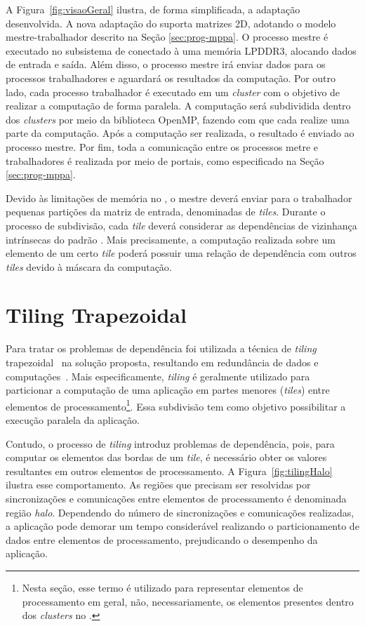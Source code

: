 A Figura~\ref{fig:visaoGeral} ilustra, de forma simplificada, a adaptação
desenvolvida. A nova adaptação do \fw suporta matrizes 2D, adotando o modelo
mestre-trabalhador descrito na Seção \ref{sec:prog-mppa}. O processo mestre é
executado no subsistema de \es conectado à uma memória LPDDR3, alocando dados de
entrada e saída. Além disso, o processo mestre irá enviar dados para os processos
trabalhadores e aguardará os resultados da computação. Por outro lado, cada processo
trabalhador é executado em um \textit{cluster} com o objetivo de realizar a
computação \stencil de forma paralela. A computação será subdividida dentro dos
\textit{clusters} por meio da biblioteca OpenMP, fazendo com que cada \pe realize uma parte
da computação. Após a computação ser realizada, o resultado é enviado ao
processo mestre. Por fim, toda a comunicação entre os processos metre e trabalhadores é
realizada por meio de portais, como especificado na Seção \ref{sec:prog-mppa}.

Devido às limitações de memória no \mppa, o mestre deverá enviar para o
trabalhador pequenas partições da matriz de entrada, denominadas de
\textit{tiles}. Durante o processo de subdivisão, cada \textit{tile} deverá
considerar as dependências de vizinhança intrínsecas do padrão \stencil. Mais
precisamente, a computação realizada sobre um elemento de um certo \textit{tile}
poderá possuir uma relação de dependência com outros \textit{tiles} devido à
máscara da computação.


\section{Tiling Trapezoidal}
\label{sec:tiling}
Para tratar os problemas de dependência foi utilizada a técnica de
\textit{tiling} trapezoidal~\cite{meng11} na solução proposta, resultando em redundância de
dados e computações~\cite{rocha17}. Mais especificamente, \textit{tiling} é
geralmente utilizado para particionar a computação de uma aplicação \stencil em
partes menores (\textit{tiles}) entre elementos de processamento\footnote{Nesta
seção, esse termo é utilizado para representar elementos de processamento em
geral, não, necessariamente, os elementos presentes dentro dos \textit{clusters}
no \mppa.}. Essa subdivisão tem como objetivo possibilitar a execução paralela da aplicação.

Contudo, o processo de \textit{tiling} introduz problemas de dependência, pois,
para computar os elementos das bordas de um \textit{tile}, é necessário obter
os valores resultantes em outros elementos de processamento. A Figura~\ref{fig:tilingHalo} ilustra
esse comportamento. As regiões que precisam ser resolvidas por sincronizações e
comunicações entre elementos de processamento é denominada região \textit{halo}. Dependendo do número
de sincronizações e comunicações realizadas, a aplicação pode demorar um tempo
considerável realizando o particionamento de dados entre elementos de
processamento, prejudicando o desempenho da aplicação.

